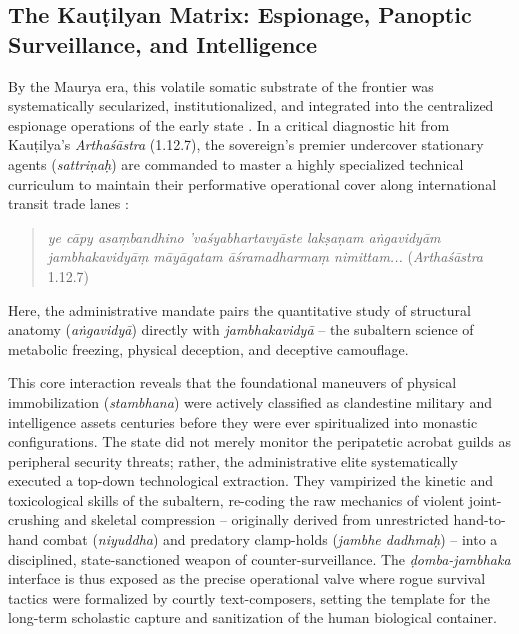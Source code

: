 \documentclass[11pt,twoside,letterpaper]{article}
\begin{document}
\subsection{The Kauṭilyan Matrix: Espionage, Panoptic Surveillance, and Intelligence}
By the Maurya era, this volatile somatic substrate of the frontier was systematically secularized, institutionalized, and integrated into the centralized espionage operations of the early state \citep{Kangle1969}. In a critical diagnostic hit from Kauṭilya’s \textit{Arthaśāstra} (1.12.7), the sovereign’s premier undercover stationary agents (\textit{sattriṇaḥ}) are commanded to master a highly specialized technical curriculum to maintain their performative operational cover along international transit trade lanes \citep{Kangle1969}:
\begin{quote}
\textit{ye cāpy asaṃbandhino ’vaśyabhartavyāste lakṣaṇam aṅgavidyām jambhakavidyāṃ māyāgatam āśramadharmaṃ nimittam...} (\textit{Arthaśāstra} 1.12.7)
\end{quote}
Here, the administrative mandate pairs the quantitative study of structural anatomy (\textit{aṅgavidyā}) directly with \textit{jambhakavidyā} – the subaltern science of metabolic freezing, physical deception, and deceptive camouflage.

This core interaction reveals that the foundational maneuvers of physical immobilization (\textit{stambhana}) were actively classified as clandestine military and intelligence assets centuries before they were ever spiritualized into monastic configurations. The state did not merely monitor the peripatetic acrobat guilds as peripheral security threats; rather, the administrative elite systematically executed a top-down technological extraction. They vampirized the kinetic and toxicological skills of the subaltern, re-coding the raw mechanics of violent joint-crushing and skeletal compression – originally derived from unrestricted hand-to-hand combat (\textit{niyuddha}) and predatory clamp-holds (\textit{jambhe dadhmaḥ}) – into a disciplined, state-sanctioned weapon of counter-surveillance. The \textit{ḍomba-jambhaka} interface is thus exposed as the precise operational valve where rogue survival tactics were formalized by courtly text-composers, setting the template for the long-term scholastic capture and sanitization of the human biological container.
\end{document}
